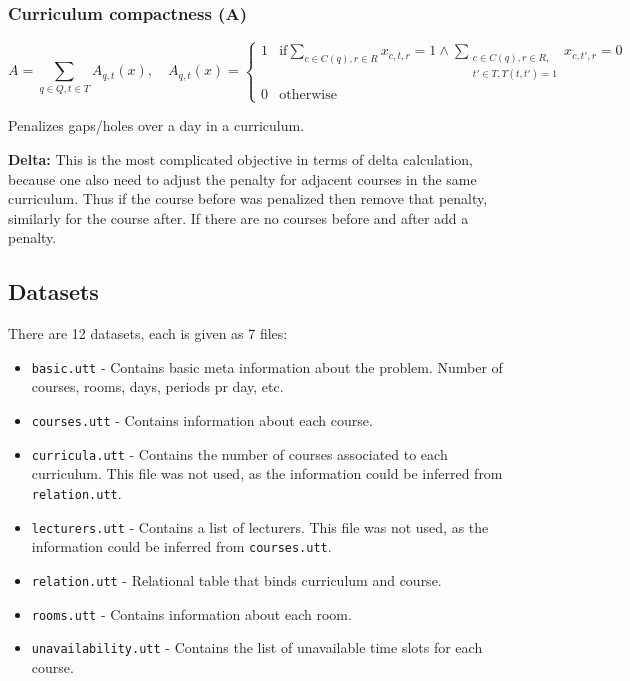 \subsubsection{Curriculum compactness (A)}
\begin{equation*}
A = \sum_{q \in Q, t \in T} A_{q, t}(x), \quad A_{q, t}(x) = \begin{cases}
1 & \text{if} \displaystyle \sum_{c \in C(q), r \in R} x_{c, t, r} = 1 \wedge \sum_{\substack{c \in C(q), r \in R,\\ t' \in T, \Upsilon(t, t')  = 1}} x_{c, t', r} = 0 \\
0 & \text{otherwise}
\end{cases}
\end{equation*}

Penalizes gaps/holes over a day in a curriculum.

\textbf{Delta: } This is the most complicated objective in terms of delta calculation, because one also need to adjust the penalty for adjacent courses in the same curriculum. Thus if the course before was penalized then remove that penalty, similarly for the course after. If there are no courses before and after add a penalty.

\subsection{Datasets}

There are 12 datasets, each is given as 7 files:
\begin{itemize}
\item \texttt{basic.utt} - Contains basic meta information about the problem. Number of courses, rooms, days, periods pr day, etc.
\item \texttt{courses.utt} - Contains information about each course.
\item \texttt{curricula.utt} - Contains the number of courses associated to each curriculum. This file was not used, as the information could be inferred from \texttt{relation.utt}.
\item \texttt{lecturers.utt} - Contains a list of lecturers. This file was not used, as the information could be inferred from \texttt{courses.utt}.
\item \texttt{relation.utt} - Relational table that binds curriculum and course.
\item \texttt{rooms.utt} - Contains information about each room.
\item \texttt{unavailability.utt} - Contains the list of unavailable time slots for each course.
\end{itemize}

